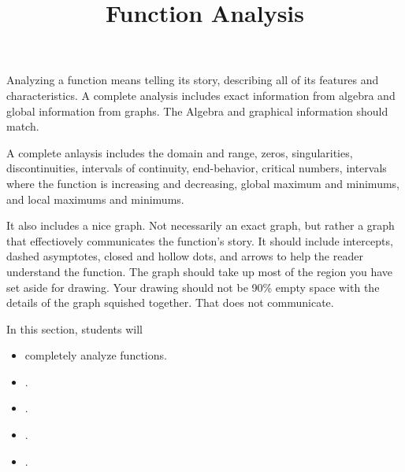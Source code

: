 \documentclass{ximera}
\title{Function Analysis}
\begin{document}
\begin{abstract}
\end{abstract}
\maketitle




Analyzing a function means telling its story, describing all of its features and characteristics.  A complete analysis includes exact information from algebra and global information from graphs.  The Algebra and graphical information should match.

A complete anlaysis includes the domain and range, zeros, singularities, discontinuities, intervals of continuity, end-behavior, critical numbers, intervals where the function is increasing and decreasing, global maximum and minimums, and local maximums and minimums.

It also includes a nice graph.  Not necessarily an exact graph, but rather a graph that effectiovely communicates the function's story. It should include intercepts, dashed asymptotes, closed and hollow dots, and arrows to help the reader understand the function.  The graph should take up most of the region you have set aside for drawing.  Your drawing should not be 90\% empty space with the details of the graph squished together.  That does not communicate.
























\begin{sectionOutcomes}
In this section, students will 

\begin{itemize}
\item completely analyze functions.
\item .
\item .
\item .
\item .
\end{itemize}
\end{sectionOutcomes}
\end{document}
